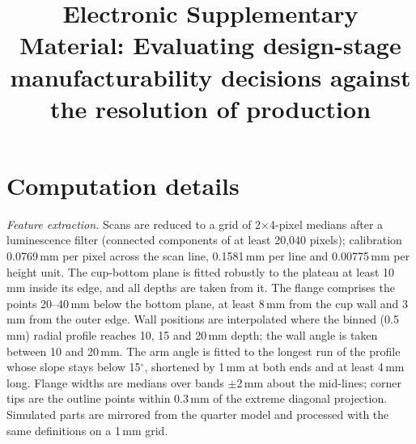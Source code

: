 \documentclass[pdflatex,sn-basic]{sn-jnl}
\newif\ifanon
\begin{document}
\title[Supplementary material]{Electronic Supplementary Material: Evaluating design-stage manufacturability decisions against the resolution of production}

\ifanon
\author*[1]{\fnm{Anonymised} \sur{for review}}
\affil*[1]{\orgname{Affiliation withheld for review}}
\else
\author*[1]{ }
\fi



\maketitle

\section{Computation details}\label{sec:s-computation}

\emph{Feature extraction.} Scans are reduced to a grid of 2$\times$4-pixel medians after a luminescence filter (connected components of at least 20,040 pixels); calibration 0.0769\,mm per pixel across the scan line, 0.1581\,mm per line and 0.00775\,mm per height unit. The cup-bottom plane is fitted robustly to the plateau at least 10\,mm inside its edge, and all depths are taken from it. The flange comprises the points 20--40\,mm below the bottom plane, at least 8\,mm from the cup wall and 3\,mm from the outer edge. Wall positions are interpolated where the binned (0.5\,mm) radial profile reaches 10, 15 and 20\,mm depth; the wall angle is taken between 10 and 20\,mm. The arm angle is fitted to the longest run of the profile whose slope stays below 15$^\circ$, shortened by 1\,mm at both ends and at least 4\,mm long. Flange widths are medians over bands $\pm$2\,mm about the mid-lines; corner tips are the outline points within 0.3\,mm of the extreme diagonal projection. Simulated parts are mirrored from the quarter model and processed with the same definitions on a 1\,mm grid.
\end{document}
